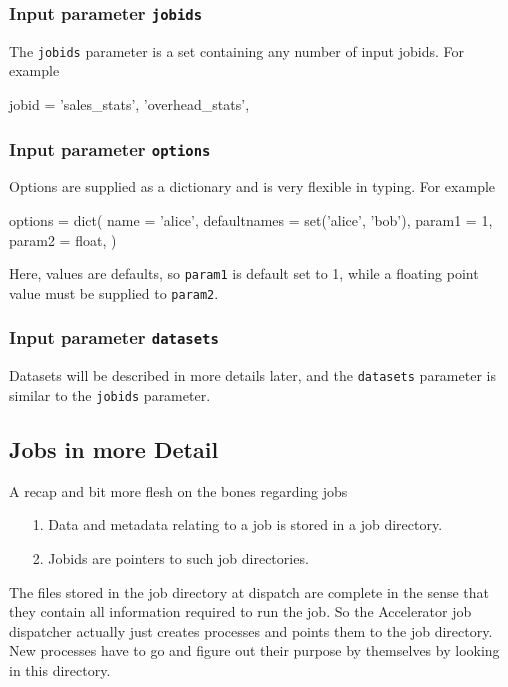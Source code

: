 \documentclass[a4paper]{article}
\begin{document}
\subsubsection{Input parameter \texttt{jobids}}
The \texttt{jobids} parameter is a set containing any number of input
jobids.  For example
\begin{python}
  jobid = {'sales_stats', 'overhead_stats',}
\end{python}


\subsubsection{Input parameter \texttt{options}}
Options are supplied as a dictionary and is very flexible in typing.  For example
\begin{python}
  options = dict(
    name = 'alice',
    defaultnames = set('alice', 'bob'),
    param1 = 1,
    param2 = float,
  )
\end{python}
Here, values are defaults, so \texttt{param1} is default set to 1,
while a floating point value must be supplied to \texttt{param2}.

\subsubsection{Input parameter \texttt{datasets}}
Datasets will be described in more details later, and the
\texttt{datasets} parameter is similar to the \texttt{jobids}
parameter.


\clearpage



\subsection{Jobs in more Detail}
A recap and bit more flesh on the bones regarding jobs
\begin{itemize}
\item[1.]  Data and metadata relating to a job is stored in a job directory.
\item[2.]  Jobids are pointers to such job directories.
\end{itemize}
The files stored in the job directory at dispatch are complete in the
sense that they contain all information required to run the job.  So
the Accelerator job dispatcher actually just creates processes and
points them to the job directory.  New processes have to go and figure
out their purpose by themselves by looking in this directory.
\end{document}
